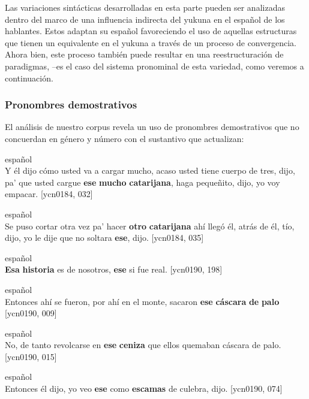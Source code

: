 \documentclass[output=paper]{langscibook}
\begin{document}
Las variaciones sintácticas desarrolladas en esta parte pueden ser analizadas dentro del marco de una influencia indirecta del yukuna en el español de los hablantes. Estos adaptan su español favoreciendo el uso de aquellas estructuras que tienen un equivalente en el yukuna a través de un proceso de convergencia.  Ahora bien, este proceso también puede resultar en una reestructuración de paradigmas, --es el caso del sistema pronominal de esta variedad, como  veremos a continuación.

 \subsubsection{Pronombres demostrativos}


El análisis de nuestro corpus revela un uso de pronombres demostrativos que no concuerdan en género y número con el sustantivo que actualizan: 

\ea
{español}\\
Y él dijo cómo usted va a cargar mucho, acaso usted tiene cuerpo de tres, dijo, pa’ que usted cargue \textbf{ese} \textbf{mucho} \textbf{catarijana}, haga pequeñito, dijo, yo voy empacar. {[ycn0184, 032]}\\
\z

\ea
{español}\\
Se puso cortar otra vez pa’ hacer \textbf{otro} \textbf{catarijana} ahí llegó él, atrás de él, tío, dijo, yo le dije que no soltara \textbf{ese}, dijo. {[ycn0184, 035]}\\
\z

\ea
{español}\\
\textbf{Esa} \textbf{historia} es de nosotros, \textbf{ese} si fue real. {[ycn0190, 198]}\\
\z

\ea
{español}\\
Entonces ahí se fueron, por ahí en el monte, sacaron \textbf{ese} \textbf{cáscara} \textbf{de} \textbf{palo} {[ycn0190, 009]}\\
\z

\ea
{español}\\
No, de tanto revolcarse en \textbf{ese} \textbf{ceniza} que ellos quemaban cáscara de palo. {[ycn0190, 015]}\\
\z

\ea
{español}\\
Entonces él dijo, yo veo \textbf{ese} como \textbf{escamas} de culebra, dijo. {[ycn0190, 074]}\\
\z
\end{document}
